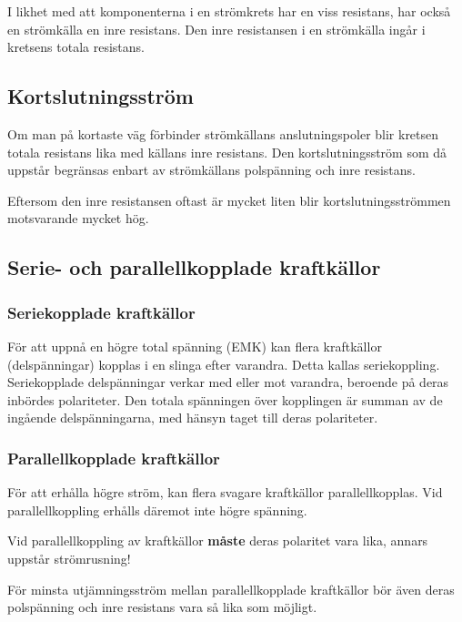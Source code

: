 I likhet med att komponenterna i en strömkrets har en viss resistans, har också
en strömkälla en inre resistans.
Den inre resistansen i en strömkälla ingår i kretsens totala resistans.

\subsection{Kortslutningsström}

Om man på kortaste väg förbinder strömkällans anslutningspoler blir kretsen
totala resistans lika med källans inre resistans. Den kortslutningsström som då
uppstår begränsas enbart av strömkällans polspänning och inre resistans.

Eftersom den inre resistansen oftast är mycket liten blir kortslutningsströmmen
motsvarande mycket hög.

\subsection{Serie- och parallellkopplade kraftkällor}

\subsubsection{Seriekopplade kraftkällor}

För att uppnå en högre total spänning (EMK) kan flera kraftkällor
(delspänningar) kopplas i en slinga efter varandra. Detta kallas seriekoppling.
Seriekopplade delspänningar verkar med eller mot varandra, beroende på deras
inbördes polariteter. Den totala spänningen över kopplingen är summan av de
ingående delspänningarna, med hänsyn taget till deras polariteter.

\subsubsection{Parallellkopplade kraftkällor}

För att erhålla högre ström, kan flera svagare kraftkällor parallellkopplas. Vid
parallellkoppling erhålls däremot inte högre spänning.

Vid parallellkoppling av kraftkällor \textbf{måste} deras polaritet vara lika,
annars uppstår strömrusning!

För minsta utjämningsström mellan parallellkopplade kraftkällor bör även deras
polspänning och inre resistans vara så lika som möjligt.
